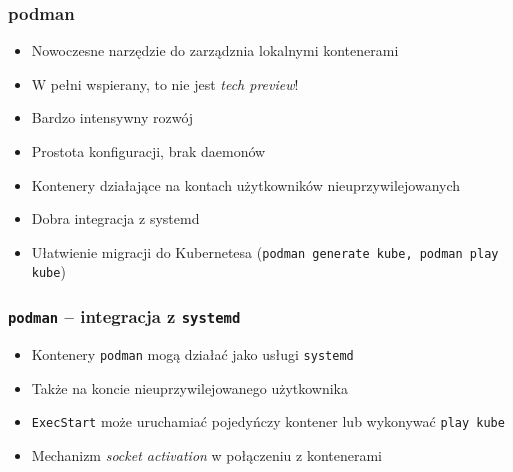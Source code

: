 \documentclass[dvipsnames,table]{beamer}
\begin{document}
\begin{frame}
	\frametitle{podman}
	\begin{itemize}
		\item Nowoczesne narzędzie do zarządznia lokalnymi kontenerami
		\item W pełni wspierany, to nie jest {\em tech preview}!
		\item Bardzo intensywny rozwój
		\item Prostota konfiguracji, brak daemonów
		\item Kontenery działające na kontach użytkowników nieuprzywilejowanych
		\item Dobra integracja z systemd
		\item Ułatwienie migracji do Kubernetesa ({\tt podman generate kube, podman play kube})
	\end{itemize}
\end{frame}

\begin{frame}[fragile]
	\frametitle{{\tt podman} -- integracja z {\tt systemd}}
	\begin{itemize}
		\item Kontenery {\tt podman} mogą działać jako usługi {\tt systemd}
		\item Także na koncie nieuprzywilejowanego użytkownika
		\item {\tt ExecStart} może uruchamiać pojedyńczy kontener lub wykonywać {\tt play kube}
		\item Mechanizm {\em socket activation} w połączeniu z kontenerami
	\end{itemize}

\end{frame}
\end{document}
